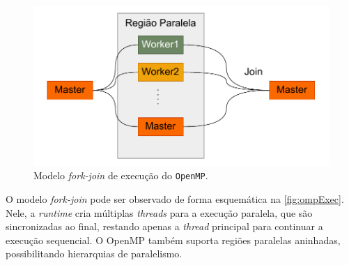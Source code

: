 \begin{figure}[htb]
    \caption{Modelo \textit{fork-join} de execução do \texttt{OpenMP}.}
    \label{fig:ompExec}
    \includegraphics[scale=0.7]{figuras/omp_exec.pdf}
    \fonte{}
\end{figure}

O modelo \textit{fork-join} pode ser observado de forma esquemática na \autoref{fig:ompExec}. Nele, a \textit{runtime} cria múltiplas \textit{threads} para a execução paralela, que são sincronizadas ao final, restando apenas a \textit{thread} principal para continuar a execução sequencial. O OpenMP também suporta regiões paralelas aninhadas, possibilitando hierarquias de paralelismo.
